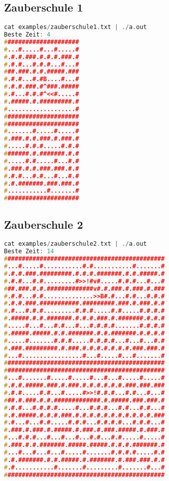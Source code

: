 \documentclass[a4paper,10pt,ngerman]{scrartcl}
\begin{document}
\subsection*{Zauberschule 1}
\begin{lstlisting}[language=C++]
cat examples/zauberschule1.txt | ./a.out
Beste Zeit: 4
#####################
#...#.....#...#.....#
#.#.#.###.#.#.#.###.#
#.#.#...#.#.#...#...#
###.###.#.#.#####.###
#.#.#...#.#B....#...#
#.#.#.###.#^###.#####
#.#...#.#.#^<<#.....#
#.#####.#.#########.#
#...................#
#####################
#####################
#.......#.....#.....#
#.###.#.#.###.#.###.#
#.....#.#.#.....#.#.#
#######.#.#######.#.#
#.....#.#.....#...#.#
#.###.#.#.###.###.#.#
#.#.#...#.#...#...#.#
#.#.#######.###.###.#
#...........#.......#
#####################
\end{lstlisting}
\pagebreak

\subsection*{Zauberschule 2}
\begin{lstlisting}[language=C++]
cat examples/zauberschule2.txt | ./a.out
Beste Zeit: 14
#############################################
#...#.....#...........#.#...........#.......#
#.#.#.###.#########.#.#.#.#######.#.#.#####.#
#.#.#...#.#.........#>>!#v#.....#.#.#...#...#
###.###.#.#.#############v#.#.###.#.###.#.###
#.#.#...#.#..............>>B#.#...#.#...#.#.#
#.#.#.###.###########.#########.###.#.###.#.#
#.#...#.#.#.........#.#.#.....#.#.....#.#.#.#
#.#####.#.#.#######.#.#.#.###.#.#######.#.#.#
#.....#...#...#.#...#...#.#.#.#.......#.#.#.#
#.#####.#####.#.#.#######.#.#.#######.#.#.#.#
#.....#.......#.#.#.....#.#.#.#...#...#...#.#
#.###.#########.#.###.#.#.#.#.#.#.#.###.###.#
#...#.................#...#.....#...#.......#
#############################################
#############################################
#...#.......#.....#.....#...#...#.....#.....#
#.#.#.#####.###.#.###.#.#.#.#.#.#.###.###.###
#.#.#.....#.#...#.....#>>!#.#.#...#.#...#...#
###.#.###.#.#.#############.#.#####.###.###.#
#.#.#...#.#.#.#.....#...#.#.#...#.#...#.#...#
#.#.#####.#.#.#.###.#.#.#.#.#.#.#.#.#.#.#.###
#.#...#...#.#.....#.#.#...#.#.#.#...#.#.#...#
#.###.#.###.#.#####.#.###.#.###.#####.#.###.#
#...#.#.#...#...#...#...#.#...#.#.....#.....#
#.###.#.#.#######.#####.#####.#.#.#.#######.#
#...#...#...#...#.....#.......#.#.#.#.....#.#
#.#.#######.#.#.#####.#.#######.#.###.###.#.#
#.#...........#.......#.........#.......#...#
#############################################
\end{lstlisting}
\pagebreak
\end{document}
